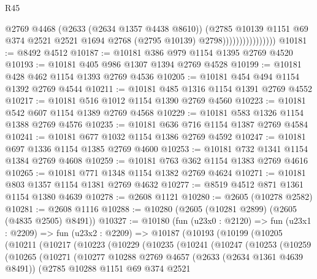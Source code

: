 \begin{lexlean}{R45}
\begin{coremodule}
                                  @2769
                                  @4468
                                  (@2633 (@2634 @1357 @4438 @8610))
                                  (@2785
                                    @10139
                                    @1151
                                    @69
                                    @374
                                    @2521
                                    @2521
                                    @1694
                                    @2768
                                    (@2795 @10139)
                                    @2798))))))))))))))))
@10181 := @8492 @4512
@10187 := @10181 @386 @979 @1154 @1395 @2769 @4520
@10193 := @10181 @405 @986 @1307 @1394 @2769 @4528
@10199 := @10181 @428 @462 @1154 @1393 @2769 @4536
@10205 := @10181 @454 @494 @1154 @1392 @2769 @4544
@10211 := @10181 @485 @1316 @1154 @1391 @2769 @4552
@10217 := @10181 @516 @1012 @1154 @1390 @2769 @4560
@10223 := @10181 @542 @607 @1154 @1389 @2769 @4568
@10229 := @10181 @583 @1326 @1154 @1388 @2769 @4576
@10235 := @10181 @636 @716 @1154 @1387 @2769 @4584
@10241 := @10181 @677 @1032 @1154 @1386 @2769 @4592
@10247 := @10181 @697 @1336 @1154 @1385 @2769 @4600
@10253 := @10181 @732 @1341 @1154 @1384 @2769 @4608
@10259 := @10181 @763 @362 @1154 @1383 @2769 @4616
@10265 := @10181 @771 @1348 @1154 @1382 @2769 @4624
@10271 := @10181 @803 @1357 @1154 @1381 @2769 @4632
@10277 := @8519 @4512 @871 @1361 @1154 @1380 @4639
@10278 := @2608 @1121
@10280 := @2605 (@10278 @2582)
@10281 := @2608 @1116
@10288 := @10280 (@2605 (@10281 @2899) (@2605 (@4835 @2505) @8491))
@10327 := @10180
    (fun (u23x0 : @2120) =>
    fun (u23x1 : @2209) =>
    fun (u23x2 : @2209) =>
    @10187
      (@10193
        (@10199
          (@10205
            (@10211
              (@10217
                (@10223
                  (@10229
                    (@10235
                      (@10241
                        (@10247
                          (@10253
                            (@10259
                              (@10265
                                (@10271
                                  (@10277
                                    @10288
                                    @2769
                                    @4657
                                    (@2633 (@2634 @1361 @4639 @8491))
                                    (@2785
                                      @10288
                                      @1151
                                      @69
                                      @374
                                      @2521

\end{coremodule}
\end{lexlean}
